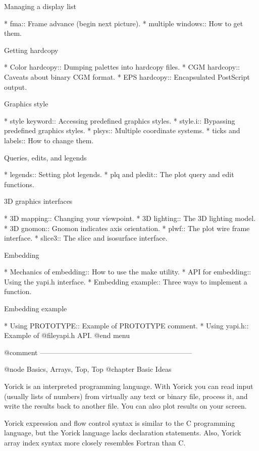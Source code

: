 Managing a display list

* fma::                         Frame advance (begin next picture).
* multiple windows::            How to get them.

Getting hardcopy

* Color hardcopy::              Dumping palettes into hardcopy files.
* CGM hardcopy::                Caveats about binary CGM format.
* EPS hardcopy::                Encapsulated PostScript output.

Graphics style

* style keyword::               Accessing predefined graphics styles.
* style.i::                     Bypassing predefined graphics styles.
* plsys::                       Multiple coordinate systems.
* ticks and labels::            How to change them.

Queries, edits, and legends

* legends::                     Setting plot legends.
* plq and pledit::              The plot query and edit functions.

3D graphics interfaces

* 3D mapping::                  Changing your viewpoint.
* 3D lighting::                 The 3D lighting model.
* 3D gnomon::                   Gnomon indicates axis orientation.
* plwf::                        The plot wire frame interface.
* slice3::                      The slice and isosurface interface.

Embedding

* Mechanics of embedding::      How to use the make utility.
* API for embedding::           Using the yapi.h interface.
* Embedding example::           Three ways to implement a function.

Embedding example

* Using PROTOTYPE::             Example of PROTOTYPE comment.
* Using yapi.h::                Example of @file{yapi.h} API.
@end menu

@comment -----------------------------------------------------------------

@node Basics, Arrays, Top, Top
@chapter Basic Ideas

Yorick is an interpreted programming language.  With Yorick you can
read input (usually lists of numbers) from virtually any text or
binary file, process it, and write the results back to another file.
You can also plot results on your screen.

Yorick expression and flow control syntax is similar to the C
programming language, but the Yorick language lacks declaration
statements.  Also, Yorick array index syntax more closely resembles
Fortran than C.


